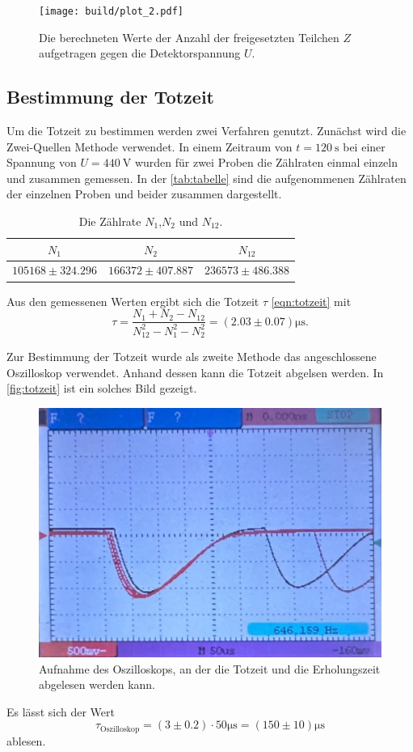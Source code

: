 \begin{figure}[H]
	\texttt{[image: build/plot\_2.pdf]}
	\caption{Die berechneten Werte der Anzahl der freigesetzten Teilchen $Z$ aufgetragen gegen die Detektorspannung $U$.}
	\label{fig:plot_2}
\end{figure}

\subsection{Bestimmung der Totzeit}
\label{sec:Bestimmung der Totzeit}

Um die Totzeit zu bestimmen werden zwei Verfahren genutzt. Zunächst wird die Zwei-Quellen Methode
verwendet. In einem Zeitraum von $t = \SI{120}{\second}$ bei einer Spannung von $U = \SI{440}{\volt}$ wurden für zwei Proben
die Zählraten einmal einzeln und zusammen gemessen.
In der \autoref{tab:tabelle} sind die aufgenommenen Zählraten der einzelnen Proben und beider zusammen dargestellt.

\begin{table}[H]
    \centering
    \caption{Die Zählrate $N_1$,$N_2$ und $N_{12}$.}
    \label{tab:tabelle}
    \begin{tabular}{c c c}
    \toprule
    $N_1$ & $N_2$ & $N_{12}$ \\
    \midrule
    $105168 \pm 324.296$ & $166372 \pm 407.887$ &$236573 \pm 486.388$ \\
    \bottomrule
    \end{tabular}
\end{table}

Aus den gemessenen Werten ergibt sich die Totzeit $\tau$ \eqref{eqn:totzeit} mit
\begin{equation*}
    \tau =\frac{N_1+N_2-N_{12}}{N_{12}^2-N_1^2-N_2^2} = \left(2.03 \pm 0.07\right) \si{\micro\second}.
\end{equation*}

Zur Bestimmung der Totzeit wurde als zweite Methode das angeschlossene Oszilloskop verwendet. Anhand dessen kann die Totzeit
abgelsen werden. In \autoref{fig:totzeit} ist ein solches Bild gezeigt.

\begin{figure}[H]
    \centering
	\includegraphics[width=0.5\linewidth]{content/grafik/zeit_1.jpg}
	\caption{Aufnahme des Oszilloskops, an der die Totzeit und die Erholungszeit abgelesen werden kann.}
	\label{fig:totzeit}
\end{figure}
Es lässt sich der Wert 
\begin{equation*}
    \tau_\text{Oszilloskop} = \left(3 \pm 0.2 \right) \cdot 50 \si{\micro\second} = \left(150 \pm  10\right) \si{\micro\second}
\end{equation*}
ablesen.
